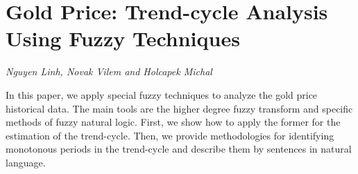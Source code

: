 \documentclass[../booklet.tex]{subfiles}
\begin{document}
\section[Gold Price: Trend-cycle Analysis Using Fuzzy Techniques. {\it Nguyen Linh, Novak Vilem and Holcapek Michal}]{Gold Price: Trend-cycle Analysis Using Fuzzy Techniques}
  

\begin{center}
  {\it Nguyen Linh, Novak Vilem and Holcapek Michal}
\end{center}

\vskip 0.8cm


		In this paper, we apply special fuzzy techniques to analyze the gold price historical data. The main tools are the higher degree fuzzy transform and specific methods of fuzzy natural logic. First, we show how to apply the former for the estimation of the trend-cycle. Then, we provide methodologies for identifying monotonous periods in the trend-cycle and describe them by sentences in natural language. 
	
\end{document}
